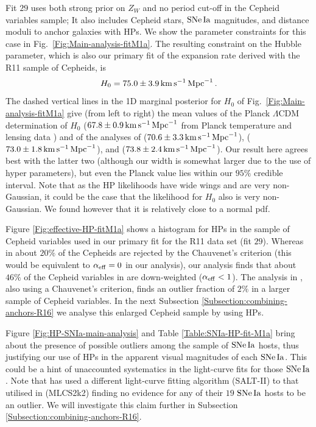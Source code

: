 Fit $29$ uses both strong prior on $Z_W$ and no period cut-off in the Cepheid variables sample; It also includes Cepheid stars, $\mathrm{SNe\,Ia}$ magnitudes, and distance moduli to anchor galaxies with HPs. 
We show the parameter constraints for this case in Fig.\ \ref{Fig:Main-analysis-fitM1a}. The resulting constraint on the Hubble parameter, which is also our primary fit of the expansion rate derived with the R11 sample of Cepheids, is
\begin{equation}\label{Eq:H0-value-standard-analysis}
	H_0 = 75.0 \pm 3.9 \, \mathrm{km}\, \mathrm{s}^{-1}\, \mathrm{Mpc}^{-1} \, .
\end{equation}
The dashed vertical lines in the 1D marginal posterior for $H_0$ of Fig.\ \ref{Fig:Main-analysis-fitM1a} give (from left to right) the mean values of the Planck $\Lambda$CDM determination of $H_0$ ($67.8\pm0.9\, \mathrm{km}\, \mathrm{s}^{-1}\, \mathrm{Mpc}^{-1}$ from Planck temperature and lensing data \cite{Ade:2015xua}) 
and of the analyses of \cite{Efstathiou:2013via} ($70.6\pm3.3\, \mathrm{km}\, \mathrm{s}^{-1}\, \mathrm{Mpc}^{-1}$), \cite{Riess:2016jrr} ($73.0\pm1.8\, \mathrm{km}\, \mathrm{s}^{-1}\, \mathrm{Mpc}^{-1}$), and \cite{Riess:2011yx} ($73.8\pm2.4\, \mathrm{km}\, \mathrm{s}^{-1}\, \mathrm{Mpc}^{-1}$). Our result here agrees best with the latter two (although our width is somewhat larger due to the use of hyper parameters), but even the Planck value lies within our $95\%$ credible interval. Note that as the HP likelihoods have wide wings and are very non-Gaussian, it could be the case that the likelihood for $H_0$ also is very
non-Gaussian. We found however that it is relatively close to a normal pdf.

Figure \ref{Fig:effective-HP-fitM1a} shows a histogram for HPs in the sample of Cepheid variables used in our primary fit for the R11 data set (fit $29$). Whereas in \cite{Riess:2011yx} about $20\%$ of the Cepheids are rejected by the Chauvenet's criterion (this would be equivalent to $\alpha_{\mathrm{eff}}=0$ in our analysis), our analysis finds that about $46\%$ of the Cepheid variables in \cite{Riess:2011yx} are down-weighted ($\alpha_{\mathrm{eff}} <1$). The analysis in \cite{Riess:2016jrr}, also using a Chauvenet's criterion, finds an outlier fraction of $2\%$ in a larger sample of Cepheid variables. In the next Subsection \ref{Subsection:combining-anchors-R16} we analyse this enlarged Cepheid sample by using HPs. 

Figure \ref{Fig:HP-SNIa-main-analysis} and Table \ref{Table:SNIa-HP-fit-M1a} bring about the presence of possible outliers among the sample of $\mathrm{SNe\,Ia}$ hosts, thus justifying our use of HPs in the apparent visual magnitudes of each $\mathrm{SNe\,Ia}$. This could be a hint of unaccounted systematics in the light-curve fits for those $\mathrm{SNe\,Ia}$. Note that \cite{Riess:2016jrr} has used a different light-curve fitting algorithm (SALT-II) to that utilised in \cite{Riess:2011yx} (MLCS2k2) finding no evidence for any of their $19$ $\mathrm{SNe\,Ia}$ hosts to be an outlier. We will investigate this claim further in Subsection \ref{Subsection:combining-anchors-R16}.  
 
